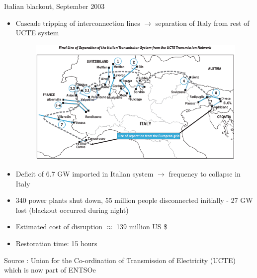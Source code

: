 \begin{frame}[allowframebreaks]{Italian blackout, September 2003}
\begin{itemize}
\item Cascade tripping of interconnection lines $\rightarrow$ separation of Italy from rest of UCTE system
\begin{figure}
\centering
\includegraphics[width=0.5\linewidth]{images/blackout_italy.png}
\end{figure}
\item Deficit of 6.7 GW imported in Italian system $\rightarrow$ frequency to collapse in Italy
\item 340 power plants shut down, 55 million people disconnected initially - 27 GW lost (blackout occurred during night)
\item Estimated cost of disruption $\approx$ 139 million US \$
\item Restoration time: 15 hours
\end{itemize}
\vfill
\footnotesize{Source : Union for the Co-ordination of Transmission of Electricity (UCTE) which is now part of ENTSOe}
\end{frame}


